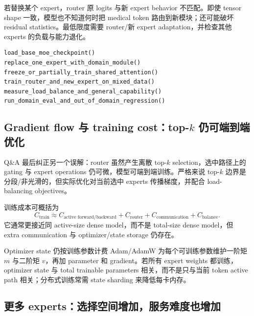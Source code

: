 \documentclass[a4paper]{article}
\begin{document}
若替换某个 expert，router 原 logits 与新 expert behavior 不匹配。即使 tensor shape 一致，模型也不知道何时把 medical token 路由到新模块；还可能破坏 residual statistics。最低限度需要 router/新 expert adaptation，并检查其他 experts 的负载与能力退化。

\begin{lstlisting}[caption={替换 expert 后的最小验证流程}]
load_base_moe_checkpoint()
replace_one_expert_with_domain_module()
freeze_or_partially_train_shared_attention()
train_router_and_new_expert_on_mixed_data()
measure_load_balance_and_general_capability()
run_domain_eval_and_out_of_domain_regression()
\end{lstlisting}


\subsection{Gradient flow 与 training cost：\texorpdfstring{top-$k$}{top-k} 仍可端到端优化}

Q\&A 最后纠正另一个误解：router 虽然产生离散 top-$k$ selection，选中路径上的 gating 与 expert operations 仍可微，模型可端到端训练。严格来说 top-$k$ 边界是分段/非光滑的，但实际优化对当前选中 experts 传播梯度，并配合 load-balancing objectives。

训练成本可概括为
\[
C_{\text{train}}\approx C_{\text{active forward/backward}}+C_{\text{router}}+C_{\text{communication}}+C_{\text{balance}}.
\]
它通常更接近同 active-size dense model，而不是 total-size dense model，但 extra communication 与 optimizer/state storage 仍存在。

\begin{knowledgebox}{Optimizer state 仍按训练参数计费}
Adam/AdamW 为每个可训练参数维护一阶矩 $m$ 与二阶矩 $v$，再加 parameter 和 gradient。若所有 expert weights 都训练，optimizer state 与 total trainable parameters 相关，而不是只与当前 token active path 相关；分布式训练常需 state sharding 来降低每卡内存。
\end{knowledgebox}


\subsection{更多 experts：选择空间增加，服务难度也增加}
\end{document}
